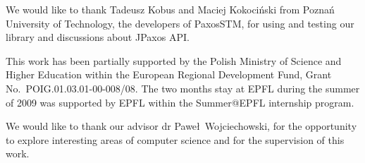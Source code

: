 We would like to thank Tadeusz Kobus and Maciej Kokociński from Poznań University
of Technology, the developers of PaxosSTM, for using and testing our library and
discussions about JPaxos API.

This work has been partially supported by the Polish Ministry of Science and
Higher Education within the European Regional Development Fund, Grant No.\
POIG.01\-.03\-.01-00-008/08. The two months stay at EPFL during the summer of 2009
was supported by EPFL within the Summer@EPFL internship program.

We would like to thank our advisor dr Pawe\l\ Wojciechowski, for the opportunity
to explore interesting areas of computer science and for the supervision of
this work.

\cleardoublepage
